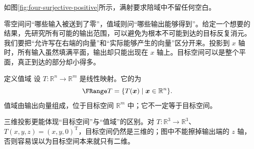 \documentclass[a4paper,12pt,twoside,openany,fontset=none]{ctexbook}
\newcounter{definition}[chapter]
\newenvironment{definition}[1][]{\begin{defBox}{定义}{#1}}{\end{defBox}}
\numberwithin{equation}{chapter}
\begin{document}
如图\ref{fig:four-surjective-positive}所示，满射要求陪域中不留任何空白。


零空间问“哪些输入被送到了零”，值域则问“哪些输出能够得到”。给定一个想要的结果，先研究所有可能的输出范围，可以避免为根本不可能到达的目标反复消元。我们要把“允许写在右端的向量”和“实际能够产生的向量”区分开来。投影到 $x$ 轴时，所有输入虽然填满平面，输出却只能出现在 $x$ 轴上。目标空间可以是整个平面，真正到达的部分却小得多。

\begin{definition}[值域]
设 $T:\mathbb R^n\to\mathbb R^m$ 是线性映射。它的为
\[
 \FRange T=\{T(\boldsymbol x)\mid\boldsymbol x\in\mathbb R^n\}.
\]
值域由输出向量组成，位于目标空间 $\mathbb R^m$ 中；它不一定等于目标空间。
\end{definition}


三维投影更能体现“目标空间”与“值域”的区别。对 $T:\mathbb R^3\to\mathbb R^3$、$T(x,y,z)=(x,y,0)^{\mathrm T}$，目标空间仍然是三维的；图中不能擦掉输出端的 $z$ 轴，否则容易误以为目标空间本来就只有二维。
\end{document}
